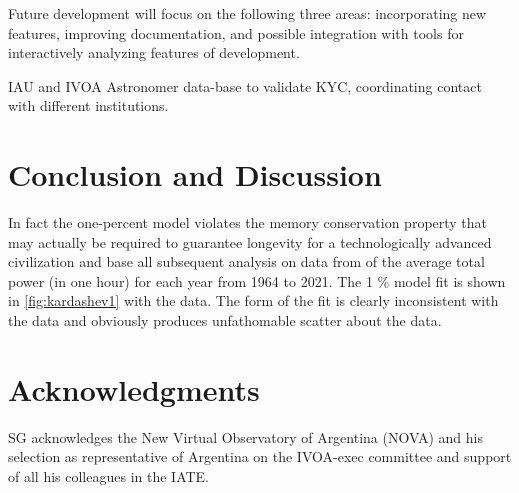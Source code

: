 \documentclass[final,5p,times,twocolumn,authoryear]{elsarticle}
\begin{document}
Future development will focus on the following three areas: incorporating
new features, improving documentation, and 
possible integration with tools for interactively analyzing features of development.

IAU and IVOA Astronomer data-base to validate KYC, coordinating contact with different institutions. 

\section{Conclusion and Discussion}
\label{sec:conc}
In fact the one-percent model violates the memory conservation property that may actually be required to guarantee longevity for a technologically advanced civilization and base all subsequent analysis on data from \cite{owidenergy} of the average total power (in one hour) for each year from 1964 to 2021. The 1 \% model fit is shown in \ref{fig:kardashev1} with the data. The form of the fit is clearly inconsistent with the data and obviously produces unfathomable scatter about the data.
\section{Acknowledgments}
SG acknowledges the New Virtual Observatory of Argentina (NOVA) and his selection as representative of Argentina on the IVOA-exec committee and support of all his colleagues in the IATE.

%


\end{document}
